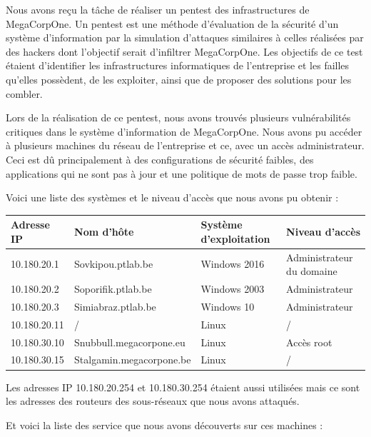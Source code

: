 \documentclass[french,paper=a4,oneside,captions=tableheading]{article}
\begin{document}
Nous avons reçu la tâche de réaliser un pentest des infrastructures de MegaCorpOne. Un pentest est une méthode d'évaluation de la sécurité d'un système d'information par la simulation d'attaques similaires à celles réalisées par des hackers dont l'objectif serait d'infiltrer MegaCorpOne. Les objectifs de ce test étaient d'identifier les infrastructures informatiques de l'entreprise et les failles qu'elles possèdent, de les exploiter, ainsi que de proposer des solutions pour les combler.

Lors de la réalisation de ce pentest, nous avons trouvés plusieurs vulnérabilités critiques dans le système d'information de MegaCorpOne. Nous avons pu accéder à plusieurs machines du réseau de l'entreprise et ce, avec un accès administrateur. Ceci est dû principalement à des configurations de sécurité faibles, des applications qui ne sont pas à jour et une politique de mots de passe trop faible.

Voici une liste des systèmes et le niveau d'accès que nous avons pu obtenir :

\begin{center} \begin{tabular}{llll}
    Adresse IP    & Nom d'hôte               & Système d'exploitation & Niveau d'accès            \\ \hline
    10.180.20.1   & Sovkipou.ptlab.be        & Windows 2016           & Administrateur du domaine \\
    10.180.20.2   & Soporifik.ptlab.be       & Windows 2003           & Administrateur            \\
    10.180.20.3   & Simiabraz.ptlab.be       & Windows 10             & Administrateur            \\
    10.180.20.11  & /                        & Linux                  & /                         \\
    10.180.30.10  & Snubbull.megacorpone.eu  & Linux                  & Accès root \\
    10.180.30.15  & Stalgamin.megacorpone.be & Linux                  & /                         \\
\end{tabular} \end{center}
Les adresses IP 10.180.20.254 et 10.180.30.254 étaient aussi utilisées mais ce sont les adresses des routeurs des sous-réseaux que nous avons attaqués.

Et voici la liste des service que nous avons découverts sur ces machines :
\end{document}
